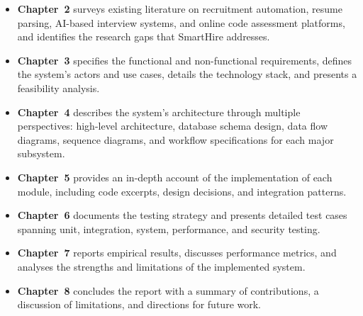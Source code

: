 \begin{itemize}[leftmargin=1.5em]
  \item \textbf{Chapter~2} surveys existing literature on recruitment automation, resume parsing, AI-based interview systems, and online code assessment platforms, and identifies the research gaps that SmartHire addresses.
  \item \textbf{Chapter~3} specifies the functional and non-functional requirements, defines the system's actors and use cases, details the technology stack, and presents a feasibility analysis.
  \item \textbf{Chapter~4} describes the system's architecture through multiple perspectives: high-level architecture, database schema design, data flow diagrams, sequence diagrams, and workflow specifications for each major subsystem.
  \item \textbf{Chapter~5} provides an in-depth account of the implementation of each module, including code excerpts, design decisions, and integration patterns.
  \item \textbf{Chapter~6} documents the testing strategy and presents detailed test cases spanning unit, integration, system, performance, and security testing.
  \item \textbf{Chapter~7} reports empirical results, discusses performance metrics, and analyses the strengths and limitations of the implemented system.
  \item \textbf{Chapter~8} concludes the report with a summary of contributions, a discussion of limitations, and directions for future work.
\end{itemize}
